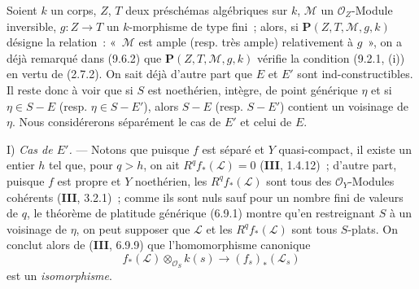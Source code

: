 Soient $k$ un corps, $Z$, $T$ deux préschémas algébriques sur $k$, $\mathcal M$
un $\mathcal O_Z$-Module inversible, $g:Z\to T$ un $k$-morphisme de type fini~;
alors, si $\mathbf P(Z,T,\mathcal M,g,k)$ désigne la relation~: «~$\mathcal M$ est ample
(resp. très ample) relativement à $g$~», on a déjà remarqué dans (9.6.2) que
$\mathbf P(Z,T,\mathcal M,g,k)$ vérifie la condition (9.2.1, (i)) en vertu de (2.7.2).
On sait déjà d'autre part que $E$ et $E'$ sont ind-constructibles. Il reste donc
à voir que si $S$ est noethérien, intègre, de point générique $\eta$ et si
$\eta\in S-E$ (resp. $\eta\in S-E'$), alors $S-E$ (resp. $S-E'$) contient un
voisinage de $\eta$. Nous considérerons séparément le cas de $E'$ et celui de
$E$.

I) \emph{Cas de $E'$.} --- Notons que puisque $f$ est séparé et $Y$
quasi-compact, il existe un entier $h$ tel que, pour $q>h$, on ait
$R^qf_*(\mathcal L)=0$ (\textbf{III}, 1.4.12)~; d'autre part, puisque $f$ est
propre et $Y$ noethérien, les $R^qf_*(\mathcal L)$ sont tous des
$\mathcal O_Y$-Modules cohérents (\textbf{III}, 3.2.1)~; comme ils sont nuls
sauf pour un nombre fini de valeurs de $q$, le théorème de platitude générique
(6.9.1) montre qu'en restreignant $S$ à un voisinage de $\eta$, on peut
supposer que $\mathcal L$ et les $R^qf_*(\mathcal L)$ sont tous $S$-plats. On
conclut alors de (\textbf{III}, 6.9.9) que l'homomorphisme canonique
\begin{equation}
\label{IV.9.6.3.1-fr}
 f_*(\mathcal L)\otimes_{\mathcal O_S} k(s)
 \longrightarrow (f_s)_*(\mathcal L_s)
 \tag{9.6.3.1}
\end{equation}
est un \emph{isomorphisme}.


